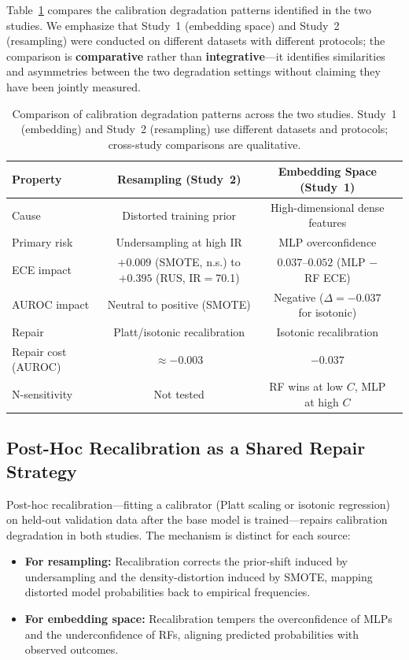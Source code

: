 \documentclass[11pt]{article}
\begin{document}
Table~\ref{tab:synthesis} compares the calibration degradation patterns identified in the two studies. We emphasize that Study~1 (embedding space) and Study~2 (resampling) were conducted on different datasets with different protocols; the comparison is \textbf{comparative} rather than \textbf{integrative}---it identifies similarities and asymmetries between the two degradation settings without claiming they have been jointly measured.

\begin{table}[t]
\centering
\footnotesize
\caption{Comparison of calibration degradation patterns across the two studies. Study~1 (embedding) and Study~2 (resampling) use different datasets and protocols; cross-study comparisons are qualitative.}
\label{tab:synthesis}
\begin{tabular}{@{}lccc@{}}
\toprule
\textbf{Property} & \textbf{Resampling (Study~2)} & \textbf{Embedding Space (Study~1)} \\
\midrule
Cause           & Distorted training prior  & High-dimensional dense features \\
Primary risk    & Undersampling at high IR  & MLP overconfidence \\
ECE impact      & $+0.009$ (SMOTE, n.s.) to $+0.395$ (RUS, IR$=$70.1) & $0.037$--$0.052$ (MLP $-$ RF ECE) \\
AUROC impact    & Neutral to positive (SMOTE) & Negative ($\Delta{=}-0.037$ for isotonic) \\
Repair          & Platt/isotonic recalibration & Isotonic recalibration \\
Repair cost (AUROC) & $\approx -0.003$        & $-0.037$ \\
N-sensitivity   & Not tested                & RF wins at low $C$, MLP at high $C$ \\
\bottomrule
\end{tabular}
\end{table}

\subsection{Post-Hoc Recalibration as a Shared Repair Strategy}

Post-hoc recalibration---fitting a calibrator (Platt scaling or isotonic regression) on held-out validation data after the base model is trained---repairs calibration degradation in both studies. The mechanism is distinct for each source:
\begin{itemize}[leftmargin=*,nosep]
 \item \textbf{For resampling:} Recalibration corrects the prior-shift induced by undersampling and the density-distortion induced by SMOTE, mapping distorted model probabilities back to empirical frequencies.
 \item \textbf{For embedding space:} Recalibration tempers the overconfidence of MLPs and the underconfidence of RFs, aligning predicted probabilities with observed outcomes.
\end{itemize}
\end{document}
